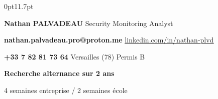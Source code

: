 \documentclass[9pt,a4paper]{extarticle}
\newlength{\gNameContact}  \setlength{\gNameContact}  {7.9pt}
\newcommand{\sz}[2]{\fontsize{#1}{#2}\selectfont}
\begin{document}
\vspace*{-4pt}

\begin{adjustwidth}{0pt}{11.7pt}

\noindent
{\displayfont\bfseries\sz{23}{23}Nathan PALVADEAU}%
\hfill
{\displayfont\sz{14}{14}Security Monitoring Analyst}%
\par

\vspace{\gNameContact}

\noindent
\parbox[t]{295pt}{%
  \sz{9}{12}\raggedright
  \textbf{nathan.palvadeau.pro@proton.me} \textbullet{}
  \href{https://linkedin.com/in/nathan-plvd}{\underline{linkedin.com/in/nathan-plvd}}\par
  \textbf{+33 7 82 81 73 64} \textbullet{} Versailles (78) \textbullet{} Permis B\par
}%
\hfill
\parbox[t]{235pt}{%
  \sz{8.75}{11.7}\raggedleft
  \textbf{Recherche alternance sur 2 ans}\par
  4 semaines entreprise / 2 semaines école\par
}

\end{adjustwidth}
\end{document}
